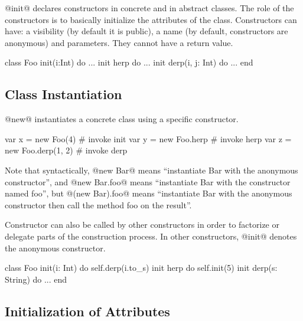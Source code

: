 @init@ declares constructors in concrete and in abstract classes.
The role of the constructors is to basically initialize the attributes of the class.
Constructors can have: a visibility (by default it is public), a name (by default, constructors are anonymous) and parameters.
They cannot have a return value.

\begin{lst}
class Foo
	init(i:Int) do ...
	init herp do ...
	init derp(i, j: Int) do ...
end
\end{lst}

\subsection{Class Instantiation}\label{new}

@new@ instantiates a concrete class using a specific constructor. 
\begin{lst}
var x = new Foo(4) # invoke init
var y = new Foo.herp # invoke herp
var z = new Foo.derp(1, 2) # invoke derp
\end{lst}
Note that syntactically, @new Bar@ means ``instantiate Bar with the anonymous constructor'', and @new Bar.foo@ means ``instantiate Bar with the constructor named foo'', but @(new Bar).foo@ means ``instantiate Bar with the anonymous constructor then call the method foo on the result''.

Constructor can also be called by other constructors in order to factorize or delegate parts of the construction process.
In other constructors, @init@ denotes the anonymous constructor.
\begin{lst}
class Foo
	init(i: Int) do self.derp(i.to_s)
	init herp do self.init(5)
	init derp(s: String) do ...
end
\end{lst}

\subsection{Initialization of Attributes}\label{initialization}\label{isset}

